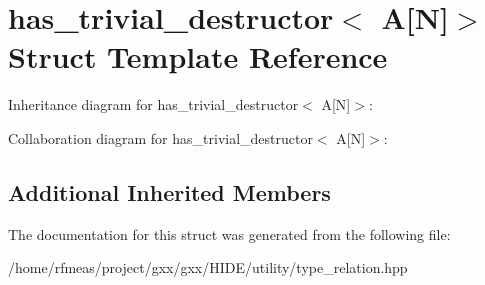\hypertarget{structhas__trivial__destructor_3_01A[N]_4}{}\section{has\+\_\+trivial\+\_\+destructor$<$ A\mbox{[}N\mbox{]}$>$ Struct Template Reference}
\label{structhas__trivial__destructor_3_01A[N]_4}


Inheritance diagram for has\+\_\+trivial\+\_\+destructor$<$ A\mbox{[}N\mbox{]}$>$\+:


Collaboration diagram for has\+\_\+trivial\+\_\+destructor$<$ A\mbox{[}N\mbox{]}$>$\+:
\subsection*{Additional Inherited Members}


The documentation for this struct was generated from the following file\+:\begin{DoxyCompactItemize}
\item 
/home/rfmeas/project/gxx/gxx/\+H\+I\+D\+E/utility/type\+\_\+relation.\+hpp\end{DoxyCompactItemize}
